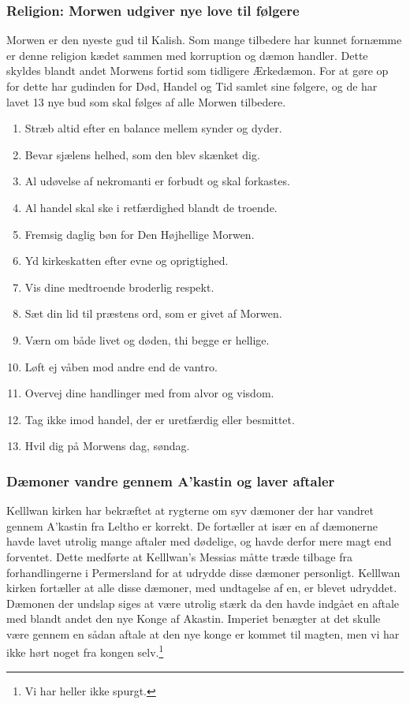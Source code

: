 \documentclass[letterpaper,12pt]{memoir}
\begin{document}
\subsubsection*{Religion: Morwen udgiver nye love til følgere}
Morwen er den nyeste gud til Kalish. Som mange tilbedere har kunnet fornæmme er denne religion kædet sammen med korruption og dæmon handler. Dette skyldes blandt andet Morwens fortid som tidligere Ærkedæmon. For at gøre op for dette har gudinden for Død, Handel og Tid samlet sine følgere, og de har lavet 13 nye bud som skal følges af alle Morwen tilbedere.
\begin{enumerate}
\item Stræb altid efter en balance mellem synder og dyder.  
\item Bevar sjælens helhed, som den blev skænket dig.  
\item Al udøvelse af nekromanti er forbudt og skal forkastes.  
\item Al handel skal ske i retfærdighed blandt de troende.  
\item Fremsig daglig bøn for Den Højhellige Morwen.  
\item Yd kirkeskatten efter evne og oprigtighed.  
\item Vis dine medtroende broderlig respekt.  
\item Sæt din lid til præstens ord, som er givet af Morwen.  
\item Værn om både livet og døden, thi begge er hellige.  
\item Løft ej våben mod andre end de vantro.  
\item Overvej dine handlinger med from alvor og visdom.  
\item Tag ikke imod handel, der er uretfærdig eller besmittet.  
\item Hvil dig på Morwens dag, søndag.  
\end{enumerate}

\subsubsection*{Dæmoner vandre gennem A'kastin og laver aftaler}
Kelllwan kirken har bekræftet at rygterne om syv dæmoner der har vandret gennem A'kastin fra Leltho er korrekt. De fortæller at især en af dæmonerne havde lavet utrolig mange aftaler med dødelige, og havde derfor mere magt end forventet. Dette medførte at Kelllwan's Messias måtte træde tilbage fra forhandlingerne i Permersland for at udrydde disse dæmoner personligt. Kelllwan kirken fortæller at alle disse dæmoner, med undtagelse af en, er blevet udryddet.\\
Dæmonen der undslap siges at være utrolig stærk da den havde indgået en aftale med blandt andet den nye Konge af Akastin. Imperiet benægter at det skulle være gennem en sådan aftale at den nye konge er kommet til magten, men vi har ikke hørt noget fra kongen selv.\footnote{Vi har heller ikke spurgt.}
\end{document}
